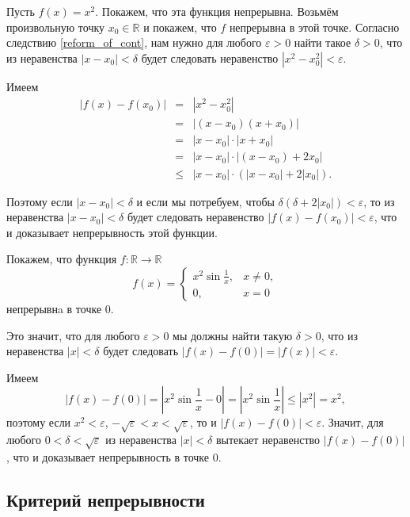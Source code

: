 \begin{example}\label{x^2_is_continous}
    Пусть $f(x) = x^2$. Покажем, что эта функция непрерывна. Возьмём произвольную точку $x_0 \in \mathbb{R}$ и покажем, что $f$ непрерывна в этой точке. Согласно следствию \ref{reform_of_cont}, нам нужно для любого $\varepsilon>0$ найти такое $\delta >0$, что из неравенства $|x- x_0|< \delta$ будет следовать неравенство $|x^2 - x_0^2|<\varepsilon.$

    Имеем
    \begin{eqnarray*}
        |f(x)- f(x_0)| &=& |x^2 - x_0^2| \\
        &=& |(x-x_0)(x+x_0)| \\
        &=& |x-x_0| \cdot |x+x_0| \\
        &=& |x-x_0|\cdot \left| (x-x_0) + 2x_0 \right| \\
        &\le& |x-x_0| \cdot \left( |x-x_0| + 2 |x_0| \right).
    \end{eqnarray*}

Поэтому если $|x-x_0|<\delta$ и если мы потребуем, чтобы $\delta (\delta + 2|x_0|)<\varepsilon$, то из неравенства $|x-x_0|<\delta$ будет следовать неравенство $|f(x)- f(x_0)| < \varepsilon$, что и доказывает непрерывность этой функции. 
\end{example}

\begin{example}\label{x^2sin(1x)}
Покажем, что функция $f:\mathbb{R} \to \mathbb{R}$
    \[
    f(x) = \begin{cases}
         x^2 \sin \frac{1}{x}, & x \ne 0, \\
         0, & x =0
     \end{cases}
    \]
непрерывнa в точке $0$.

Это значит, что для любого $\varepsilon >0$ мы должны найти такую $\delta >0$, что из неравенства $|x|<\delta$ будет следовать $|{f}(x) - {f}(0)| = |f(x)| <\varepsilon.$

Имеем 
    \[
    \left|{f}(x) -{f}(0)\right| = \left|x^2 \sin \frac{1}{x} - 0 \right| = \left|x^2 \sin \frac{1}{x}\right| \le |x^2| = x^2,
    \]
поэтому если $x^2 <\varepsilon$, \ie $-\sqrt{ \varepsilon} <x < \sqrt{\varepsilon}$, то и $|{f}(x) - {f}(0)| <\varepsilon$. Значит, для любого $0 < \delta < \sqrt{\varepsilon}$ из неравенства $|x|<\delta$ вытекает неравенство $|{f}(x) - {f}(0)|$, что и доказывает непрерывность в точке $0.$
\end{example}

\subsection{Критерий непрерывности}


